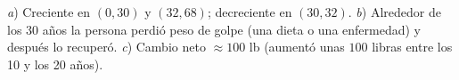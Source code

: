 \documentclass[11pt]{article}
\begin{document}
\begin{resp}
\emph{a}) Creciente en $(0,30)$ y $(32,68)$; decreciente en $(30,32)$. \quad
\emph{b}) Alrededor de los 30 años la persona perdió peso de golpe (una dieta o una enfermedad) y después lo recuperó. \quad
\emph{c}) Cambio neto $\approx 100$ lb (aumentó unas $100$ libras entre los 10 y los 20 años).
\end{resp}
\end{document}
